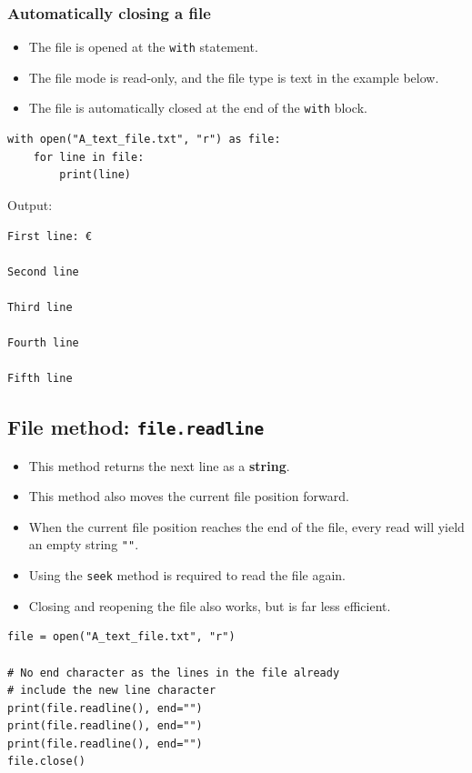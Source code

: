 \documentclass[11pt]{article}
\begin{document}
\subsubsection{Automatically closing a file}
\label{sec:org04e5dff}
\begin{itemize}
\item The file is opened at the \texttt{with} statement.
\item The file mode is read-only, and the file type is text in the example below.
\item The file is automatically closed at the end of the \texttt{with} block.
\end{itemize}

\begin{verbatim}
with open("A_text_file.txt", "r") as file:
    for line in file:
        print(line)
\end{verbatim}

 \noindent Output:

\begin{verbatim}
First line: €

Second line

Third line

Fourth line

Fifth line

\end{verbatim}

\subsection{File method: \texttt{file.readline}}
\label{sec:org8e9bc96}
\begin{itemize}
\item This method returns the next line as a \textbf{string}.
\item This method also moves the current file position forward.
\item When the current file position reaches the end of the file, every read will yield an empty string \texttt{""}.
\item Using the \texttt{seek} method is required to read the file again.
\item Closing and reopening the file also works, but is far less efficient.
\end{itemize}

\begin{verbatim}
file = open("A_text_file.txt", "r")

# No end character as the lines in the file already
# include the new line character
print(file.readline(), end="")
print(file.readline(), end="")
print(file.readline(), end="")
file.close()
\end{verbatim}
\end{document}
